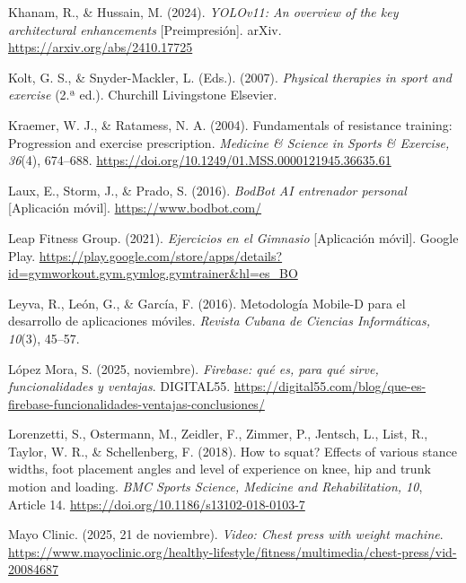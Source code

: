 \begin{referenciasapa}
\item Khanam, R., \& Hussain, M. (2024). \textit{YOLOv11: An overview of the key architectural enhancements} [Preimpresión]. arXiv. \url{https://arxiv.org/abs/2410.17725}

\item Kolt, G. S., \& Snyder-Mackler, L. (Eds.). (2007). \textit{Physical therapies in sport and exercise} (2.ª ed.). Churchill Livingstone Elsevier.

\item Kraemer, W. J., \& Ratamess, N. A. (2004). Fundamentals of resistance training: Progression and exercise prescription. \textit{Medicine \& Science in Sports \& Exercise, 36}(4), 674--688. \url{https://doi.org/10.1249/01.MSS.0000121945.36635.61}

\item Laux, E., Storm, J., \& Prado, S. (2016). \textit{BodBot AI entrenador personal} [Aplicación móvil]. \url{https://www.bodbot.com/}

\item Leap Fitness Group. (2021). \textit{Ejercicios en el Gimnasio} [Aplicación móvil]. Google Play. \url{https://play.google.com/store/apps/details?id=gymworkout.gym.gymlog.gymtrainer&hl=es_BO}

\item Leyva, R., León, G., \& García, F. (2016). Metodología Mobile-D para el desarrollo de aplicaciones móviles. \textit{Revista Cubana de Ciencias Informáticas, 10}(3), 45--57.

\item López Mora, S. (2025, noviembre). \textit{Firebase: qué es, para qué sirve, funcionalidades y ventajas}. DIGITAL55. \url{https://digital55.com/blog/que-es-firebase-funcionalidades-ventajas-conclusiones/}

\item Lorenzetti, S., Ostermann, M., Zeidler, F., Zimmer, P., Jentsch, L., List, R., Taylor, W. R., \& Schellenberg, F. (2018). How to squat? Effects of various stance widths, foot placement angles and level of experience on knee, hip and trunk motion and loading. \textit{BMC Sports Science, Medicine and Rehabilitation, 10}, Article 14. \url{https://doi.org/10.1186/s13102-018-0103-7}

\item Mayo Clinic. (2025, 21 de noviembre). \textit{Video: Chest press with weight machine}. \url{https://www.mayoclinic.org/healthy-lifestyle/fitness/multimedia/chest-press/vid-20084687}


\end{referenciasapa}
